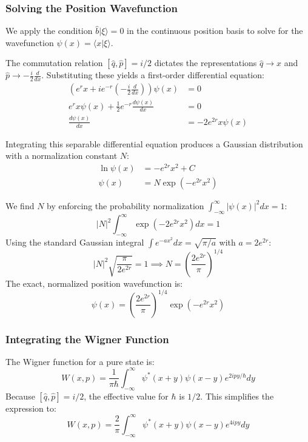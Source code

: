 \subsubsection{Solving the Position Wavefunction}
We apply the condition $\hat{b}|\xi\rangle = 0$ in the continuous position basis to solve for the wavefunction $\psi(x) = \langle x | \xi \rangle$. 

The commutation relation $[\hat{q}, \hat{p}] = i/2$ dictates the representations $\hat{q} \to x$ and $\hat{p} \to -\frac{i}{2}\frac{d}{dx}$. Substituting these yields a first-order differential equation:
\begin{align*}
\left( e^{r} x + i e^{-r} \left( -\frac{i}{2}\frac{d}{dx} \right) \right) \psi(x) &= 0 \\
e^{r} x \psi(x) + \frac{1}{2} e^{-r} \frac{d\psi(x)}{dx} &= 0 \\
\frac{d\psi(x)}{dx} &= -2 e^{2r} x \psi(x)
\end{align*}

Integrating this separable differential equation produces a Gaussian distribution with a normalization constant $N$:
\begin{align*}
\ln \psi(x) &= -e^{2r} x^2 + C \\
\psi(x) &= N \exp\left(-e^{2r} x^2\right)
\end{align*}

We find $N$ by enforcing the probability normalization $\int_{-\infty}^{\infty} |\psi(x)|^2 dx = 1$:
\begin{equation*}
|N|^2 \int_{-\infty}^{\infty} \exp\left(-2e^{2r} x^2\right) dx = 1
\end{equation*}
Using the standard Gaussian integral $\int e^{-ax^2} dx = \sqrt{\pi/a}$ with $a = 2e^{2r}$:
\begin{equation*}
|N|^2 \sqrt{\frac{\pi}{2e^{2r}}} = 1 \implies N = \left( \frac{2e^{2r}}{\pi} \right)^{1/4}
\end{equation*}
The exact, normalized position wavefunction is:
\begin{equation*}
\psi(x) = \left( \frac{2e^{2r}}{\pi} \right)^{1/4} \exp\left(-e^{2r} x^2\right)
\end{equation*}

\subsubsection{Integrating the Wigner Function}
The Wigner function for a pure state is:
\begin{equation*}
W(x,p) = \frac{1}{\pi\hbar} \int_{-\infty}^{\infty} \psi^*(x+y)\psi(x-y) e^{2ipy/\hbar} dy
\end{equation*}
Because $[\hat{q}, \hat{p}] = i/2$, the effective value for $\hbar$ is $1/2$. This simplifies the expression to:
\begin{equation*}
W(x,p) = \frac{2}{\pi} \int_{-\infty}^{\infty} \psi^*(x+y)\psi(x-y) e^{4ipy} dy
\end{equation*}

